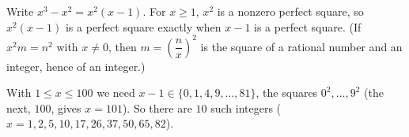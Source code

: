 Write $x^3-x^2=x^2(x-1)$. For $x\ge1$, $x^2$ is a nonzero perfect square, so $x^2(x-1)$ is a perfect square exactly when $x-1$ is a perfect square. (If $x^2m=n^2$ with $x\ne0$, then $m=\left(\dfrac {n}{x}\right)^2$ is the square of a rational number and an integer, hence of an integer.)

With $1\le x\le100$ we need $x-1\in\{0,1,4,9,\dots,81\}$, the squares $0^2,\dots,9^2$ (the next, $100$, gives $x=101$). So there are $\boxed{10}$ such integers ($x=1,2,5,10,17,26,37,50,65,82$).
